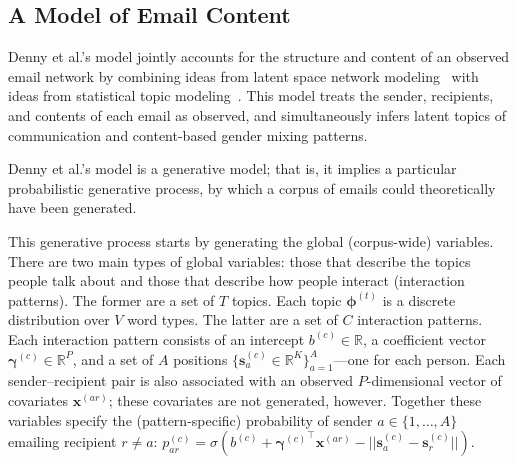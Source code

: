 \documentclass{pnastwo}
\newcommand{\bs}{\boldsymbol{s}}
\newcommand{\bx}{\boldsymbol{x}}
\newcommand{\bgamma}{\boldsymbol{\gamma}}
\newcommand{\bphi}{\boldsymbol{\phi}}
\begin{document}
\begin{article}


\subsection{A Model of Email Content}

Denny et al.'s model jointly accounts for the structure and content of
an observed email network by combining ideas from latent space network
modeling~\cite{Hoff2002a} with ideas from statistical topic
modeling~\cite{Blei2003}. This model treats the sender, recipients,
and contents of each email as observed, and simultaneously infers
latent topics of communication and content-based gender mixing
patterns.

Denny et al.'s model is a generative model; that is, it implies a
particular probabilistic generative process, by which a corpus of
emails could theoretically have been generated.

This generative process starts by generating the global (corpus-wide)
variables. There are two main types of global variables: those that
describe the topics people talk about and those that describe how
people interact (interaction patterns). The former are a set of $T$
topics. Each topic $\bphi^{(t)}$ is a discrete distribution over $V$
word types. The latter are a set of $C$ interaction patterns. Each
interaction pattern consists of an intercept $b^{(c)} \in \mathbb{R}$,
a coefficient vector $\bgamma^{(c)} \in \mathbb{R}^P$, and a set of
$A$ positions $\{ \bs^{(c)}_a \in \mathbb{R}^K \}_{a=1}^A$---one for
each person. Each sender--recipient pair is also associated with an
observed $P$-dimensional vector of covariates $\bx^{(ar)}$; these
covariates are not generated, however. Together these variables
specify the (pattern-specific) probability of sender $a \in \{1,
\ldots, A\}$ emailing recipient $r \neq a$: $p^{(c)}_{ar} =
\sigma(b^{(c)} + {\bgamma^{(c)}}^{\top} \bx^{(ar)} - ||\bs_{a}^{(c)} -
\bs_{r}^{(c)}||)$.


\end{article}
\end{document}
